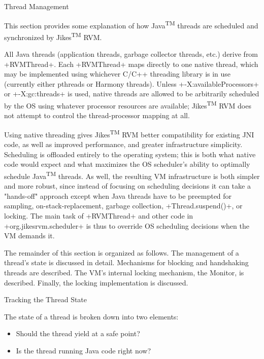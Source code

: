 \begin{section}{Thread Management}
\label{sec:threadmanagement}

This section provides some explanation of how Java\textsuperscript{TM} threads are scheduled and synchronized by Jikes\textsuperscript{TM} RVM.

All Java threads (application threads, garbage collector threads, etc.) derive from \spverb+RVMThread+. Each \spverb+RVMThread+ maps directly to one native thread, which may be implemented using whichever C/C++ threading library is in use (currently either pthreads or Harmony threads). Unless \spverb+-X:availableProcessors+ or \spverb+-X:gc:threads+ is used, native threads are allowed to be arbitrarily scheduled by the OS using whatever processor resources are available; Jikes\textsuperscript{TM} RVM does not attempt to control the thread-processor mapping at all.

Using native threading gives Jikes\textsuperscript{TM} RVM better compatibility for existing JNI code, as well as improved performance, and greater infrastructure simplicity. Scheduling is offloaded entirely to the operating system; this is both what native code would expect and what maximizes the OS scheduler's ability to optimally schedule Java\textsuperscript{TM} threads. As well, the resulting VM infrastructure is both simpler and more robust, since instead of focusing on scheduling decisions it can take a "hands-off" approach except when Java threads have to be preempted for sampling, on-stack-replacement, garbage collection, \spverb+Thread.suspend()+, or locking. The main task of \spverb+RVMThread+ and other code in \spverb+org.jikesrvm.scheduler+ is thus to override OS scheduling decisions when the VM demands it.

The remainder of this section is organized as follows. The management of a thread's state is discussed in detail. Mechanisms for blocking and handshaking threads are described. The VM's internal locking mechanism, the Monitor, is described. Finally, the locking implementation is discussed.

\begin{subsection}{Tracking the Thread State}

The state of a thread is broken down into two elements:
\begin{itemize}
  \item Should the thread yield at a safe point?
  \item Is the thread running Java code right now?
\end{itemize}


\end{subsection}
\end{section}
